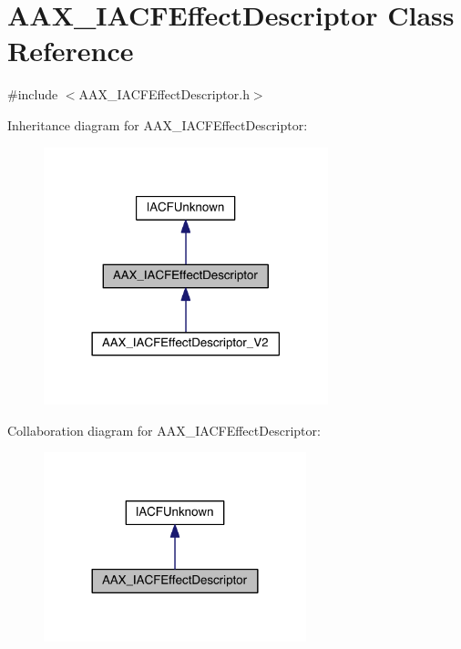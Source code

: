 \hypertarget{a00057}{}\section{A\+A\+X\+\_\+\+I\+A\+C\+F\+Effect\+Descriptor Class Reference}
\label{a00057}


{\ttfamily \#include $<$A\+A\+X\+\_\+\+I\+A\+C\+F\+Effect\+Descriptor.\+h$>$}



Inheritance diagram for A\+A\+X\+\_\+\+I\+A\+C\+F\+Effect\+Descriptor\+:
\nopagebreak
\begin{figure}[H]
\begin{center}
\leavevmode
\includegraphics[width=234pt]{a00514}
\end{center}
\end{figure}


Collaboration diagram for A\+A\+X\+\_\+\+I\+A\+C\+F\+Effect\+Descriptor\+:
\nopagebreak
\begin{figure}[H]
\begin{center}
\leavevmode
\includegraphics[width=216pt]{a00515}
\end{center}
\end{figure}


